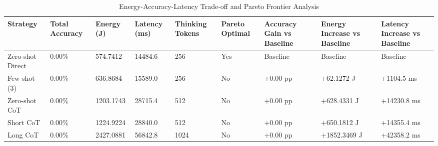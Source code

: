 \begin{table}
\caption{Energy-Accuracy-Latency Trade-off and Pareto Frontier Analysis}
\label{tab:tradeoff_comparison}
\begin{tabular}{lllllllll}
\toprule
Strategy & Total Accuracy & Energy (J) & Latency (ms) & Thinking Tokens & Pareto Optimal & Accuracy Gain vs Baseline & Energy Increase vs Baseline & Latency Increase vs Baseline \\
\midrule
Zero-shot Direct & 0.00\% & 574.7412 & 14484.6 & 256 & Yes & Baseline & Baseline & Baseline \\
Few-shot (3) & 0.00\% & 636.8684 & 15589.0 & 256 & No & +0.00 pp & +62.1272 J & +1104.5 ms \\
Zero-shot CoT & 0.00\% & 1203.1743 & 28715.4 & 512 & No & +0.00 pp & +628.4331 J & +14230.8 ms \\
Short CoT & 0.00\% & 1224.9224 & 28840.0 & 512 & No & +0.00 pp & +650.1812 J & +14355.4 ms \\
Long CoT & 0.00\% & 2427.0881 & 56842.8 & 1024 & No & +0.00 pp & +1852.3469 J & +42358.2 ms \\
\bottomrule
\end{tabular}
\end{table}

